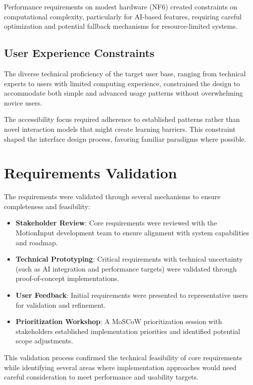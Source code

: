 Performance requirements on modest hardware (NF6) created constraints on computational complexity, particularly for AI-based features, requiring careful optimization and potential fallback mechanisms for resource-limited systems.

\subsection{User Experience Constraints}
The diverse technical proficiency of the target user base, ranging from technical experts to users with limited computing experience, constrained the design to accommodate both simple and advanced usage patterns without overwhelming novice users.

The accessibility focus required adherence to established patterns rather than novel interaction models that might create learning barriers. This constraint shaped the interface design process, favoring familiar paradigms where possible.

\section{Requirements Validation}
The requirements were validated through several mechanisms to ensure completeness and feasibility:

\begin{itemize}
    \item \textbf{Stakeholder Review}: Core requirements were reviewed with the MotionInput development team to ensure alignment with system capabilities and roadmap.
    
    \item \textbf{Technical Prototyping}: Critical requirements with technical uncertainty (such as AI integration and performance targets) were validated through proof-of-concept implementations.
    
    \item \textbf{User Feedback}: Initial requirements were presented to representative users for validation and refinement.
    
    \item \textbf{Prioritization Workshop}: A MoSCoW prioritization session with stakeholders established implementation priorities and identified potential scope adjustments.
\end{itemize}

This validation process confirmed the technical feasibility of core requirements while identifying several areas where implementation approaches would need careful consideration to meet performance and usability targets.


